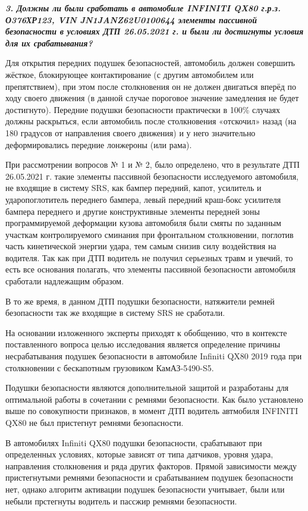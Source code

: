 \textsl{\textbf{3. 	Должны ли были сработать в автомобиле INFINITI QX80 г.р.з. О376ХР123, VIN JN1JANZ62U0100644 элементы пассивной безопасности в условиях ДТП 26.05.2021 г. и были ли достигнуты условия для их срабатывания?}}

Для открытия передних подушек безопасностей, автомобиль должен совершить жёсткое, блокирующее контактирование (с другим автомобилем или препятствием), при этом после столкновения он не должен двигаться вперёд по ходу своего движения (в данной случае пороговое значение замедления не будет достигнуто). Передние подушки безопасности практически в 100\% случаях должны раскрыться, если автомобиль после столкновения «отскочил» назад (на 180 градусов от направления своего движения) и у него значительно деформировались передние лонжероны (или рама).

При рассмотрении вопросов № 1 и № 2, было определено, что в результате ДТП 26.05.2021 г. такие элементы пассивной безопасности исследуемого автомобиля, не входящие в систему SRS, как   бампер передний, капот, усилитель и ударопоглотитель переднего бампера, левый передний краш-бокс усилителя бампера переднего и другие конструктивные элементы  передней зоны программируемой деформации кузова автомобиля были смяты по  заданным участкам контролируемого сминания  при фронтальном столкновении, поглотив часть кинетической энергии удара, тем самым  снизив силу воздействия на водителя.   Так как  при ДТП водитель не получил серьезных травм и увечий, то есть все основания полагать, что  элементы пассивной безопасности автомобиля сработали надлежащим образом. 

 
В то же время, в данном ДТП подушки безопасности, натяжители ремней безопасности так же входящие в систему SRS не сработали.


На основании изложенного эксперты приходят к обобщению, что в контексте поставленного вопроса целью  исследования  является  определение причины несрабатывания подушек безопасности в автомобиле Infiniti QX80 2019 года при столкновении с бескапотным грузовиком КамАЗ-5490-S5.


Подушки безопасности являются дополнительной защитой и разработаны для оптимальной работы в сочетании с ремнями безопасности. Как было установлено выше  по совокупности признаков,  в момент ДТП водитель автмобиля INFINITI QX80 не был пристегнут ремнями безопасности.

 В автомобилях Infiniti QX80 подушки безопасности, \cite{патент:US8801033B2} срабатывают при определенных условиях, которые зависят от типа датчиков, уровня удара, направления столкновения и ряда других факторов. Прямой зависимости между пристегнутыми ремнями безопасности и срабатыванием подушек безопасности нет, однако алгоритм активации подушек безопасности учитывает, были или небыли  прстегнуты водитель и пассжир ремнями безопасности.
 
